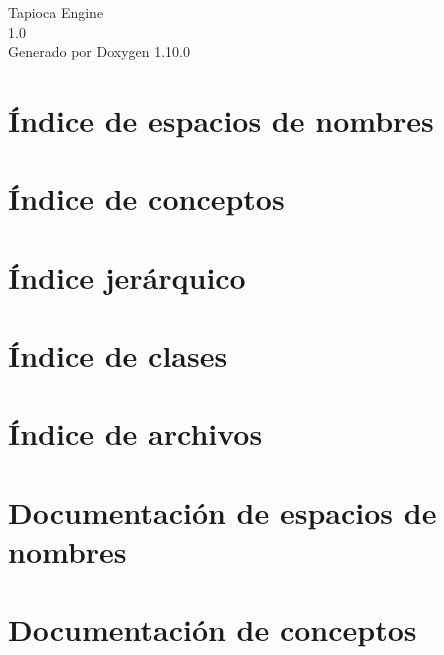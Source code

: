 \documentclass[twoside]{book}
\newcommand{\+}{\discretionary{\mbox{\scriptsize$\hookleftarrow$}}{}{}}
\newcommand{\clearemptydoublepage}{%
    \newpage{\pagestyle{empty}\cleardoublepage}%
  }
\begin{document}
  \raggedbottom
    \hypersetup{pageanchor=false,
                bookmarksnumbered=true,
                pdfencoding=unicode
               }
  \begin{titlepage}
  \vspace*{7cm}
  \begin{center}%
  {\Large Tapioca Engine}\\
  [1ex]\large 1.\+0 \\
  \vspace*{1cm}
  {\large Generado por Doxygen 1.10.0}\\
  \end{center}
  \end{titlepage}
  \clearemptydoublepage
  \tableofcontents
  \clearemptydoublepage
  \hypersetup{pageanchor=true}

\chapter{Índice de espacios de nombres}

\chapter{Índice de conceptos}

\chapter{Índice jerárquico}

\chapter{Índice de clases}

\chapter{Índice de archivos}

\chapter{Documentación de espacios de nombres}







\chapter{Documentación de conceptos}

\end{document}
